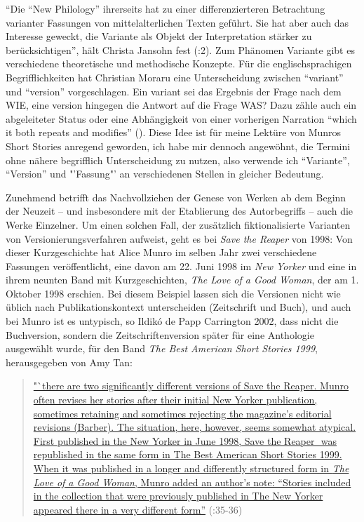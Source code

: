 \documentclass[fontsize=12pt]{scrartcl}
\begin{document}
"`Die "`New Philology"' ihrerseits hat zu einer differenzierteren Betrachtung varianter Fassungen von mittelalterlichen Texten gef\"uhrt. Sie hat aber auch das Interesse geweckt, die Variante als Objekt der Interpretation st\"arker zu ber\"ucksichtigen"', h\"alt Christa Jansohn fest (\cite{Jansohn2005}:2). Zum Ph\"anomen Variante gibt es verschiedene theo\-retische und methodische Konzepte. 
F\"ur die eng\-lischspra\-chi\-gen Begrifflichkei\-ten hat Christian Moraru eine Unterscheidung zwischen "`variant"' und "`version"' vorgeschlagen. Ein variant sei das Ergebnis der Frage nach dem WIE, eine version hingegen die Antwort auf die Frage WAS? Dazu z\"ahle auch ein abgeleiteter Status oder eine Abh\"angigkeit von einer vorherigen Narration "`which it both repeats and modifies"' (\cite{Moraru2005}). Diese Idee ist f\"ur meine Lekt\"ure von Munros Short Stories anregend geworden, ich habe mir dennoch angew\"ohnt, die Termini ohne n\"ahere begrifflich Unterscheidung zu nutzen, also verwende ich "`Variante"', "`Version"' und "'Fassung"' an verschiedenen Stellen in gleicher Bedeutung. 

Zunehmend betrifft das Nachvollziehen der Genese von Werken ab dem Beginn der Neuzeit -- und insbesondere mit der Etablierung des Autor\textsuperscript{\tiny *}begriffs -- auch die Werke Einzelner. Um einen solchen Fall, der zus\"atzlich fiktionalisierte Varianten von Versionierungsverfahren aufweist, geht es bei \textit{Save the Reaper} von 1998: Von dieser Kurzgeschichte hat Alice Munro im selben Jahr zwei verschiedene Fassungen ver\"of\-fent\-licht, eine davon am 22. Juni 1998 im \textit{New Yorker} und eine in ihrem neun\-ten Band mit Kurzgeschichten, \textit{The Love of a Good Woman}, der am 1. Oktober 1998 erschien. Bei diesem Beispiel lassen sich die Versionen nicht wie \"ublich nach Pu\-bli\-ka\-tions\-kontext unterscheiden (Zeitschrift und Buch), und auch bei Munro ist es unty\-pisch, so Ildik\'{o} de Papp Carrington 2002, dass nicht die Buchversion, sondern die Zeitschriftenversion sp\"ater f\"ur eine Anthologie ausgew\"ahlt wurde, f\"ur den Band \textit{The Best American Short Stories 1999}, he\-rausgegeben von Amy Tan: 

\singlespacing
\begin{quote}
\href{http://canlit.ca/site/getPDF/article/10625}{"`there are two significantly different versions of \flq Save the Reaper\frq. Munro often revises her stories after their initial New Yorker publication, sometimes retaining and sometimes rejecting the magazine's editorial revisions (Barber). The situation, here, however, seems somewhat atypical. First published in the New Yorker in June 1998, \flq Save the Reaper\frq\,\, was republished in the same form in The Best American Short Stories 1999. When it was published in a longer and differently structured form in \textit{The Love of a Good Woman}, Munro added an author's note: "`Stories included in the collection that were previously published in The New Yorker appeared there in a very different form"'} (\cite{dePappCarrington2002}:35-36)
\end{quote}
\onehalfspacing
\end{document}
